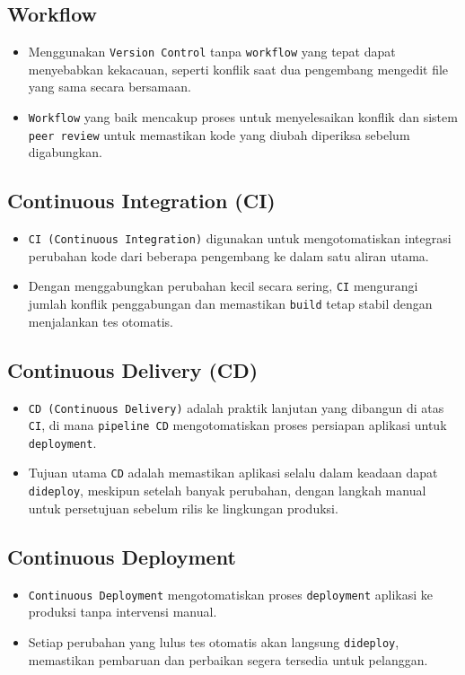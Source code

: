 \documentclass{article}
\begin{document}
\subsection{Workflow}
\begin{itemize}
    \item Menggunakan \texttt{Version Control} tanpa \texttt{workflow} yang tepat dapat menyebabkan kekacauan, seperti konflik saat dua pengembang mengedit file yang sama secara bersamaan.
    \item \texttt{Workflow} yang baik mencakup proses untuk menyelesaikan konflik dan sistem \texttt{peer review} untuk memastikan kode yang diubah diperiksa sebelum digabungkan.
\end{itemize}

\subsection{Continuous Integration (CI)}
\begin{itemize}
    \item \texttt{CI (Continuous Integration)} digunakan untuk mengotomatiskan integrasi perubahan kode dari beberapa pengembang ke dalam satu aliran utama.
    \item Dengan menggabungkan perubahan kecil secara sering, \texttt{CI} mengurangi jumlah konflik penggabungan dan memastikan \texttt{build} tetap stabil dengan menjalankan tes otomatis.
\end{itemize}

\subsection{Continuous Delivery (CD)}
\begin{itemize}
    \item \texttt{CD (Continuous Delivery)} adalah praktik lanjutan yang dibangun di atas \texttt{CI}, di mana \texttt{pipeline CD} mengotomatiskan proses persiapan aplikasi untuk \texttt{deployment}.
    \item Tujuan utama \texttt{CD} adalah memastikan aplikasi selalu dalam keadaan dapat \texttt{dideploy}, meskipun setelah banyak perubahan, dengan langkah manual untuk persetujuan sebelum rilis ke lingkungan produksi.
\end{itemize}

\subsection{Continuous Deployment}
\begin{itemize}
    \item \texttt{Continuous Deployment} mengotomatiskan proses \texttt{deployment} aplikasi ke produksi tanpa intervensi manual.
    \item Setiap perubahan yang lulus tes otomatis akan langsung \texttt{dideploy}, memastikan pembaruan dan perbaikan segera tersedia untuk pelanggan.
\end{itemize}
\end{document}
